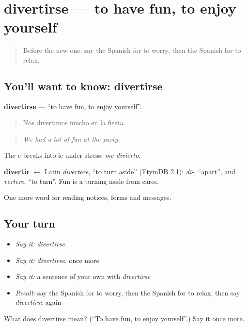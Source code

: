 \section[divertirse]{divertirse — to have fun, to enjoy yourself}

\label{lesson:ES-C487-divertirse}



\begin{quote}
Before the new one: say the Spanish for to worry, then the Spanish for to relax.
\end{quote}

\subsection*{You'll want to know: divertirse}
\textbf{divertirse} — \textquotedblleft{}to have fun, to enjoy yourself\textquotedblright{}.

\begin{quote}
Nos divertimos mucho en la fiesta.
\end{quote}

\begin{quote}
\emph{We had a lot of fun at the party.}
\end{quote}

The e breaks into ie under stress: \emph{me divierto}.

\begin{cousinweb}
\textbf{divertir} $\leftarrow$ Latin \emph{divertere}, \textquotedblleft{}to turn aside\textquotedblright{} (EtymDB 2.1): \emph{di-}, \textquotedblleft{}apart\textquotedblright{}, and \emph{vertere}, \textquotedblleft{}to turn\textquotedblright{}. Fun is a turning aside from cares.
\end{cousinweb}

\begin{grammarlens}[title={What you've built}]
One more word for reading notices, forms and messages.
\end{grammarlens}

\subsection*{Your turn}
\begin{itemize}
\raggedright
  \item \emph{Say it:} \emph{divertirse}
  \item \emph{Say it:} \emph{divertirse}, once more
  \item \emph{Say it:} a sentence of your own with \emph{divertirse}
  \item \emph{Recall:} say the Spanish for to worry, then the Spanish for to relax, then say \emph{divertirse} again
\end{itemize}

\begin{tcolorbox}[breakable,colback=teal!4,colframe=teal!35!black,title={Before you move on}]
What does divertirse mean? (\textquotedblleft{}To have fun, to enjoy yourself\textquotedblright{}.) Say it once more.
\end{tcolorbox}

